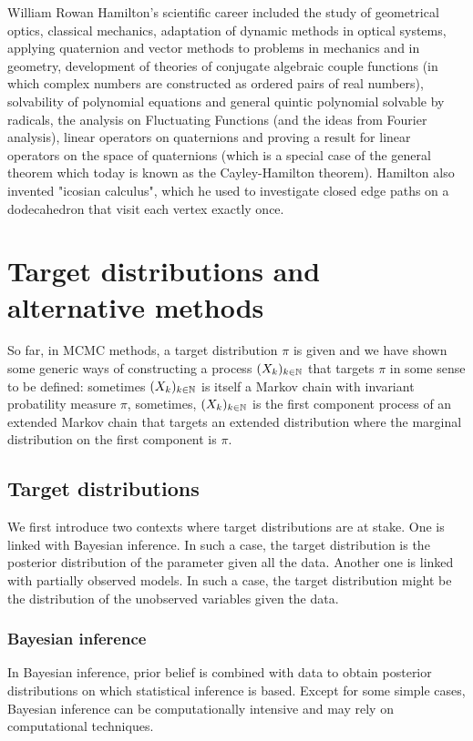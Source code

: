 \documentclass[english,graybox,envcountchap,envcountsame,sectrefs,shortlabels]{svmono}
\theoremstyle{style}
\begin{document}
\begin{subappendices}
William Rowan Hamilton's scientific career included the study of geometrical optics, classical mechanics, adaptation of dynamic methods in optical systems, applying quaternion and vector methods to problems in mechanics and in geometry, development of theories of conjugate algebraic couple functions (in which complex numbers are constructed as ordered pairs of real numbers), solvability of polynomial equations and general quintic polynomial solvable by radicals, the analysis on Fluctuating Functions (and the ideas from Fourier analysis), linear operators on quaternions and proving a result for linear operators on the space of quaternions (which is a special case of the general theorem which today is known as the Cayley-Hamilton theorem). Hamilton also invented "icosian calculus", which he used to investigate closed edge paths on a dodecahedron that visit each vertex exactly once.
\end{subappendices}


\chapter{Target distributions and alternative methods}
So far, in MCMC methods, a target distribution $\pi$ is given and we have shown some generic ways of constructing a process $(X_k)_{k\in\mathbb{N}}$ that targets $\pi$ in some sense to be defined: sometimes $(X_k)_{k\in\mathbb{N}}$ is itself a Markov chain with invariant probatility measure $\pi$, sometimes, $(X_k)_{k\in\mathbb{N}}$ is the first component process of an extended Markov chain that targets an extended distribution where the marginal distribution on the first component is $\pi$.


\section{Target distributions}
We first introduce two contexts where target distributions are at stake. One is linked with Bayesian inference. In such a case, the target distribution is the posterior distribution of the parameter given all the data. Another one is linked with partially observed models. In such a case, the target distribution  might be the distribution of the unobserved variables given the data.

\subsection{Bayesian inference}
In  Bayesian inference, prior belief  is combined with
data to obtain posterior distributions on which statistical inference is based.
Except for some simple cases, Bayesian inference can be computationally
intensive and may rely on  computational techniques.
\end{document}
